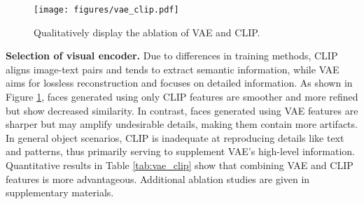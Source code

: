 \begin{table}[t]
	\centering
	\caption{The ablation experiment results of VAE and CLIP.}
	\label{tab:vae_clip}
\end{table}

\begin{figure}[t]
	\centering
	\texttt{[image: figures/vae\_clip.pdf]} 
	\caption{Qualitatively display the ablation of VAE and CLIP.}
	\label{fig:vae_clip}
\end{figure}

\noindent \textbf{Selection of visual encoder.} 
Due to differences in training methods, CLIP aligns image-text pairs and tends to extract semantic information, while VAE aims for lossless reconstruction and focuses on detailed information. As shown in Figure \ref{fig:vae_clip}, faces generated using only CLIP features are smoother and more refined but show decreased similarity. In contrast, faces generated using VAE features are sharper but may amplify undesirable details, making them contain more artifacts.
In general object scenarios, CLIP is inadequate at reproducing details like text and patterns, thus primarily serving to supplement VAE's high-level information. Quantitative results in Table \ref{tab:vae_clip} show that combining VAE and CLIP features is more advantageous. Additional ablation studies are given in supplementary materials.
